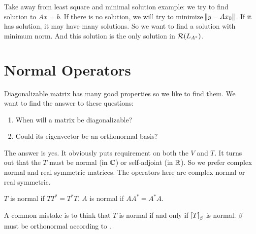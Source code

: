 Take away from least square and minimal solution example: we try to find solution to $Ax = b$. If there is no solution, we will try to minimize $\norm{y - A x_0}$. If it has solution, it may have many solutions. So we want to find a solution with minimum norm. And this solution is the only solution in $\mathcal{R}(L_{A^*})$.




\section{Normal Operators}

Diagonalizable matrix has many good properties so we like to find them. We want to find the answer to these questions:
\begin{enumerate}
    \item When will a matrix be diagonalizable?
    \item Could its eigenvector be an orthonormal basis?
\end{enumerate}

The answer is yes. It obviously puts requirement on both the $V$ and $T$. It turns out that the $T$ must be normal (in $\mathbb{C}$) or self-adjoint (in $\mathbb{R}$). So we prefer complex normal and real symmetric matrices. The operators here are complex normal or real symmetric.

\begin{definition}[Normal]
    $T$ is normal if $TT^* = T^* T$. $A$ is normal if $AA^* = A^* A$.
\end{definition}

A common mistake is to think that $T$ is normal if and only if $\coordinate{T}_\beta$ is normal. $\beta$ must be orthonormal according to .

